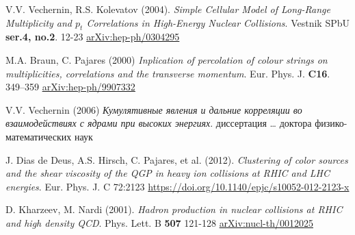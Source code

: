 \begin{thebibliography}{24}
V.V. Vechernin, R.S. Kolevatov (2004).
\textit{Simple Cellular Model of Long-Range Multiplicity and $p_t$ Correlations in High-Energy Nuclear Collisions}.
Vestnik SPbU
\textbf{ser.4, no.2}.
12-23
\href{https://arxiv.org/abs/hep-ph/0304295}{arXiv:hep-ph/0304295}

M.A. Braun, C. Pajares (2000)
\textit{Inplication of percolation of colour strings on multiplicities, correlations and the transverse momentum}.
Eur. Phys. J.
\textbf{C16}.
349–359
\href{https://arxiv.org/abs/hep-ph/9907332v1}{arXiv:hep-ph/9907332}

V.V. Vechernin (2006)
\textit{Кумулятивные явления и дальние корреляции во взаимодействиях с ядрами при высоких энергиях}.
диссертация … доктора физико-математических наук

J. Dias de Deus, A.S. Hirsch, C. Pajares, et al. (2012).
\textit{Clustering of color sources and the shear viscosity of the QGP in heavy ion collisions at RHIC and LHC energies}.
Eur. Phys. J. C 72:2123
\url{https://doi.org/10.1140/epjc/s10052-012-2123-x}

D. Kharzeev, M. Nardi (2001).
\textit{Hadron production in nuclear collisions at RHIC and high density QCD}.
Phys. Lett. B
\textbf{507}
121-128
\href{https://arxiv.org/abs/nucl-th/0012025}{arXiv:nucl-th/0012025}

\end{thebibliography}